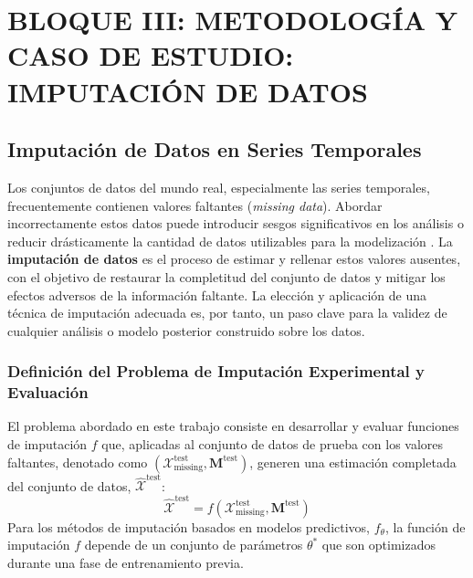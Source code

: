 \part{BLOQUE III: METODOLOGÍA Y CASO DE ESTUDIO: IMPUTACIÓN DE DATOS}

\chapter{Imputación de Datos en Series Temporales}
\label{chap:metodologia}
\glsresetall

\label{sec:intro_datos_faltantes}
Los conjuntos de datos del mundo real, especialmente las series temporales, frecuentemente contienen valores faltantes (\textit{missing data}). Abordar incorrectamente estos datos puede introducir sesgos significativos en los análisis o reducir drásticamente la cantidad de datos utilizables para la modelización \cite[Capítulo 8]{Bishop2006}. La \textbf{imputación de datos} es el proceso de estimar y rellenar estos valores ausentes, con el objetivo de restaurar la completitud del conjunto de datos y mitigar los efectos adversos de la información faltante. La elección y aplicación de una técnica de imputación adecuada es, por tanto, un paso clave para la validez de cualquier análisis o modelo posterior construido sobre los datos.

\section{Definición del Problema de Imputación Experimental y Evaluación}
\label{sec:impl_problem_formal_revised}

El problema abordado en este trabajo consiste en desarrollar y evaluar funciones de imputación $f$ que, aplicadas al conjunto de datos de prueba con los valores faltantes, denotado como $(\mathcal{X}_{\text{missing}}^{\text{test}}, \mathbf{M}^{\text{test}})$, generen una estimación completada del conjunto de datos, $\hat{\mathcal{X}}^{\text{test}}$:
\[ \hat{\mathcal{X}}^{\text{test}} = f(\mathcal{X}_{\text{missing}}^{\text{test}}, \mathbf{M}^{\text{test}}) \]
Para los métodos de imputación basados en modelos predictivos, $f_{\theta}$, la función de imputación $f$ depende de un conjunto de parámetros $\theta^*$ que son optimizados durante una fase de entrenamiento previa.

